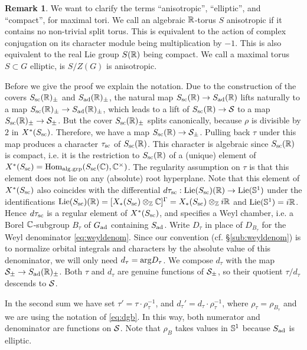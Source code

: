 \documentclass{article}
\theoremstyle{definition}
\newtheorem{rem}[thm]{Remark}
\numberwithin{equation}{section}
\renewcommand{\-}{\hyp{}}
\begin{document}
\begin{rem}
	We want to clarify the terms ``anisotropic'', ``elliptic'', and ``compact'', for maximal tori. We call an algebraic $\mathbb{R}$-torus $S$ anisotropic if it contains no non-trivial split torus. This is equivalent to the action of complex conjugation on its character module being multiplication by $-1$. This is also equivalent to the real Lie group $S(\mathbb{R})$ being compact. We call a maximal torus $S \subset G$ elliptic, is $S/Z(G)$ is anisotropic. 
\end{rem}

Before we give the proof we explain the notation. Due to the construction of the covers $S_{\textrm{sc}}(\mathbb{R})_\pm$ and $S_{\textrm{ad}}(\mathbb{R})_\pm$, the natural map $S_{\textrm{sc}}(\mathbb{R}) \to S_{\textrm{ad}}(\mathbb{R})$ lifts naturally to a map $S_{\textrm{sc}}(\mathbb{R})_\pm \to S_{\textrm{ad}}(\mathbb{R})_\pm$, which leads to a lift of $S_{\textrm{sc}}(\mathbb{R}) \to \mathcal{S}$ to a map $S_{\textrm{sc}}(\mathbb{R})_\pm \to \mathcal{S}_\pm$. But the cover $S_{\textrm{sc}}(\mathbb{R})_\pm$ splits canonically, because $\rho$ is divisible by $2$ in $X^*(S_{\textrm{sc}})$. Therefore, we have a map $S_{\textrm{sc}}(\mathbb{R}) \to \mathcal{S}_\pm$. Pulling back $\tau$ under this map produces a character $\tau_{\textrm{sc}}$ of $S_{\textrm{sc}}(\mathbb{R})$. This character is algebraic since $S_{\textrm{sc}}(\mathbb{R})$ is compact, i.e. it is the restriction to $S_{\textrm{sc}}(\mathbb{R})$ of a (unique) element of  $X^*(S_{\textrm{sc}})=\textrm{Hom}_{\textrm{alg.grp}}(S_{\textrm{sc}}(\mathbb{C}),\mathbb{C}^\times)$. The regularity assumption on $\tau$ is that this element does not lie on any (absolute) root hyperplane. Note that this element of $X^*(S_{\textrm{sc}})$ also coincides with the differential $d\tau_{\textrm{sc}} : \textrm{Lie}(S_{\textrm{sc}})(\mathbb{R}) \to \textrm{Lie}(\mathbb{S}^1)$ under the identifications $\textrm{Lie}(S_{\textrm{sc}})(\mathbb{R})=[X_*(S_{\textrm{sc}}) \otimes_{\mathbb{Z}} \mathbb{C}]^\Gamma = X_*(S_{\textrm{sc}})\otimes_{\mathbb{Z}} i\mathbb{R}$ and $\textrm{Lie}(\mathbb{S}^1)=i\mathbb{R}$. Hence $d\tau_{\textrm{sc}}$ is a regular element of $X^*(S_{\textrm{sc}})$, and specifies a Weyl chamber, i.e. a Borel $\mathbb{C}$-subgroup $B_\tau$ of $G_{\textrm{ad}}$ containing $S_{\textrm{ad}}$. Write $D_\tau$ in place of $D_{B_\tau}$ for the Weyl denominator \eqref{eq:weyldenom}. Since our convention (cf. \S\ref{sub:weyldenom}) is to normalize orbital integrals and characters by the absolute value of this denominator, we will only need $d_\tau=\textrm{arg}D_\tau$. We compose $d_\tau$ with the map $\mathcal{S}_\pm \to S_{\textrm{ad}}(\mathbb{R})_\pm$. Both $\tau$ and $d_\tau$ are genuine functions of $\mathcal{S}_\pm$, so their quotient $\tau/d_\tau$ descends to $\mathcal{S}$.

In the second sum we have set $\tau'=\tau \cdot \rho_\tau^{-1}$, and $d_\tau'=d_\tau \cdot \rho_\tau^{-1}$, where $\rho_\tau=\rho_{B_\tau}$
and we are using the notation of \eqref{eq:dgb}. In this way, both numerator and denominator are functions on $\mathcal{S}$. Note that $\rho_B$ takes values in $\mathbb{S}^1$ because $S_{\textrm{ad}}$ is elliptic.
\end{document}
